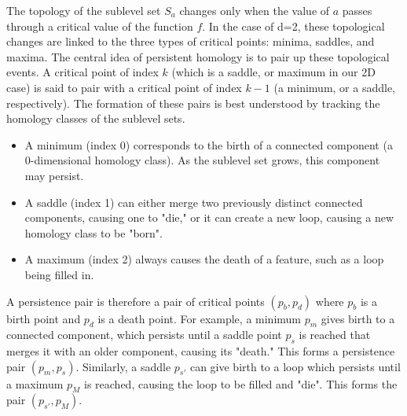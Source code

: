  The topology of the sublevel set $S_a$ changes only when the value of $a$ passes through a critical value of the function $f$. 
 In the case of d=2, these topological changes are linked to the three types of critical points: minima, saddles, and maxima.
The central idea of persistent homology is to pair up these topological events. 
A critical point of index $k$ (which is a saddle, or maximum in our 2D case) is said to pair with a critical point of index $k-1$ (a minimum, or a saddle, respectively). 
The formation of these pairs is best understood by tracking the homology classes of the sublevel sets. 
\begin{itemize}
\item A minimum (index 0) corresponds to the birth of a connected component (a 0-dimensional homology class). As the sublevel set grows, this component may persist.
\item A saddle (index 1) can either merge two previously distinct connected components, causing one to "die," or it can create a new loop, causing a new homology class to be "born".
\item A maximum (index 2) always causes the death of a feature, such as a loop being filled in.
\end{itemize}
A persistence pair is therefore a pair of critical points $(p_b,p_d)$ where $p_b$ is a birth point and $p_d$ is a death point. 
For example, a minimum $p_m$ gives birth to a connected component, which persists until a saddle point $p_s$ is reached that merges it with an older component, causing its "death." This forms a persistence pair $(p_m,p_s)$.  
Similarly, a saddle $p_{s'}$  can give birth to a loop which persists until a maximum $p_M$ is reached, causing the loop to be filled and "die". 
This forms the pair $(p_{s'},p_M)$.  

